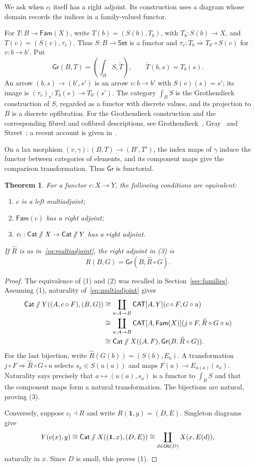 \documentclass[11pt,a4paper]{amsart}
\newtheorem{theorem}{Theorem}[section]
\theoremstyle{definition}
\numberwithin{equation}{section}
\newcommand{\Cat}{\mathsf{Cat}}
\newcommand{\CAT}{\mathsf{CAT}}
\newcommand{\Set}{\mathsf{Set}}
\newcommand{\Fam}{\mathsf{Fam}}
\newcommand{\Gr}{\mathsf{Gr}}
\newcommand{\Ob}{\mathsf{Ob}}
\newcommand{\one}{\mathbf{1}}
\newcommand{\sslash}{\mathbin{/\mkern-6mu/}}
\newcommand{\DX}{\Cat\sslash X}
\newcommand{\DY}{\Cat\sslash Y}
\begin{document}
We ask when $c_!$ itself has a right adjoint. Its construction uses a diagram whose domain records the indices in a family-valued functor.

For $T:B\to\Fam(X)$, write $T(b)=(S(b),T_b)$, with $T_b:S(b)\to X$, and $T(v)=(S(v),\tau_v)$. Thus $S:B\to\Set$ is a functor and $\tau_v:T_b\Rightarrow T_{b'}\circ S(v)$ for $v:b\to b'$. Put
\begin{equation}\label{eq:flatten}
 \Gr(B,T)=\left(\int_B S,\widetilde T\right),
 \qquad \widetilde T(b,s)=T_b(s).
\end{equation}
An arrow $(b,s)\to(b',s')$ is an arrow $v:b\to b'$ with $S(v)(s)=s'$; its image is $(\tau_v)_s:T_b(s)\to T_{b'}(s')$. The category $\int_B S$ is the Grothendieck construction of $S$, regarded as a functor with discrete values, and its projection to $B$ is a discrete opfibration. For the Grothendieck construction and the corresponding fibred and cofibred descriptions, see Grothendieck~\cite[Section~8]{SGA1}, Gray~\cite{Gray} and Street~\cite[Section~1.10]{Street}; a recent account is given in~\cite[Section~2.1]{MV}.

On a lax morphism $(v,\gamma):(B,T)\to(B',T')$, the index maps of $\gamma$ induce the functor between categories of elements, and its component maps give the comparison transformation. Thus $\Gr$ is functorial.

\begin{theorem}\label{thm:multiadjoint}
For a functor $c:X\to Y$, the following conditions are equivalent:
\begin{enumerate}
\item $c$ is a left multiadjoint;
\item $\Fam(c)$ has a right adjoint;
\item $c_!:\DX\to\DY$ has a right adjoint.
\end{enumerate}
If $\widehat R$ is as in~\eqref{eq:multiadjoint}, the right adjoint in \textup{(3)} is
\[
 R(B,G)=\Gr(B,\widehat R\circ G).
\]
\end{theorem}
\begin{proof}
The equivalence of (1) and (2) was recalled in Section~\ref{sec:families}. Assuming (1), naturality of~\eqref{eq:multiadjoint} gives
\begin{align*}
 \DY((A,c\circ F),(B,G))
 &\cong\coprod_{u:A\to B}\CAT[A,Y](c\circ F,G\circ u)\\
 &\cong\coprod_{u:A\to B}\CAT[A,\Fam(X)](j\circ F,\widehat R\circ G\circ u)\\
 &\cong\DX((A,F),\Gr(B,\widehat R\circ G)).
\end{align*}
For the last bijection, write $\widehat R(G(b))=(S(b),E_b)$. A transformation $j\circ F\Rightarrow\widehat R\circ G\circ u$ selects $s_a\in S(u(a))$ and maps $F(a)\to E_{u(a)}(s_a)$. Naturality says precisely that $a\mapsto(u(a),s_a)$ is a functor to $\int_B S$ and that the component maps form a natural transformation. The bijections are natural, proving (3).

Conversely, suppose $c_!\dashv R$ and write $R(\one,y)=(D,E)$. Singleton diagrams give
\[
 Y(c(x),y)\cong\DX((\one,x),(D,E))
 \cong\coprod_{d\in\Ob(D)}X(x,E(d)),
\]
naturally in $x$. Since $D$ is small, this proves (1).
\end{proof}
\end{document}
